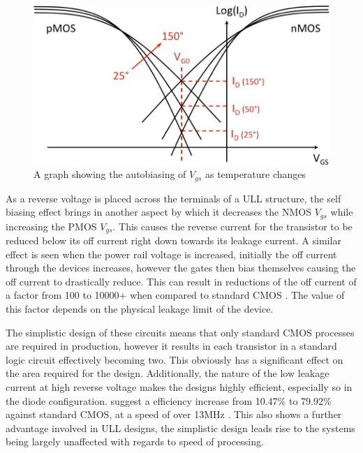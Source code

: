 \begin{figure}
	\centering
	\includegraphics[width=\columnwidth]{../../images/intersectiongraph.png}
	\caption{A graph showing the autobiasing of $V_{gs}$ as temperature changes \cite{DisruptiveULL}}
	\label{fig:ullintersect}
\end{figure}

As a reverse voltage is placed across the terminals of a \ac{ULL} structure, the self biasing effect brings in another aspect by which it decreases the NMOS $V_{gs}$ while increasing the PMOS $V_{gs}$.
This causes the reverse current for the transistor to be reduced below its off current right down towards its leakage current.
A similar effect is seen when the power rail voltage is increased, initially the off current through the devices increases, however the gates then bias themselves causing the off current to drastically reduce.
This can result in reductions of the off current of a factor from 100 to 10000+ when compared to standard CMOS \cite{ULL-AandD,DisruptiveULL}.
The value of this factor depends on the physical leakage limit of the device.

The simplistic design of these circuits means that only standard CMOS processes are required in production, however it results in each transistor in a standard logic circuit effectively becoming two.
This obviously has a significant effect on the area required for the design.
Additionally, the nature of the low leakage current at high reverse voltage makes the designs highly efficient, especially so in the diode configuration.
\citeauthor{DisruptiveULL} suggest a efficiency increase from 10.47\% to 79.92\% against standard CMOS, at a speed of over 13MHz \cite{DisruptiveULL}.
This also shows a further advantage involved in ULL designs, the simplistic design leads rise to the systems being largely unaffected with regards to speed of processing.
